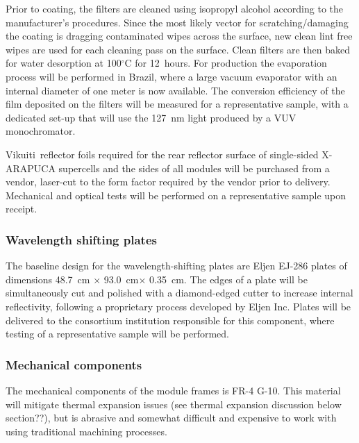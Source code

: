 Prior to coating, the filters are cleaned using isopropyl alcohol according to the manufacturer's procedures. %
Since the most likely vector for scratching/damaging the coating is dragging contaminated wipes across the surface, new clean lint free wipes are used for each cleaning pass on the surface. Clean filters are then baked for water desorption at 100$^\circ$C for \SI{12}{hours}. 
For   production the evaporation process will be performed
in Brazil, 
where a large vacuum evaporator with an internal diameter of one meter is now available. The conversion efficiency of the film deposited on the filters will be measured for a representative sample, with a dedicated set-up that will use the \SI{127}{nm} light produced by a VUV monochromator.

Vikuiti\texttrademark\ reflector foils required for the rear reflector surface of single-sided X-ARAPUCA supercells and the sides of all modules will be purchased from a vendor, laser-cut to the form factor required by the vendor prior to delivery.  Mechanical and optical  tests will be performed on a representative sample upon receipt.

\subsubsection{Wavelength shifting plates}

The baseline design for the wavelength-shifting plates are %
Eljen EJ-286 plates of dimensions \SI{48.7}{cm} $\times$ \SI{93.0}{cm}$\times$ \SI{0.35}{cm}.  The edges of a plate will be simultaneously cut and polished with a diamond-edged cutter to increase internal reflectivity, following a proprietary process developed by Eljen Inc.  Plates will be delivered to the consortium institution responsible for this component, where  testing of a representative sample will be performed.

\subsubsection{Mechanical components}

The mechanical components %
of the  module frames is %
FR-4 G-10.  %
This material will mitigate thermal expansion issues (see thermal expansion discussion below section??), %
but is abrasive and somewhat difficult and expensive to work with using traditional machining processes.


